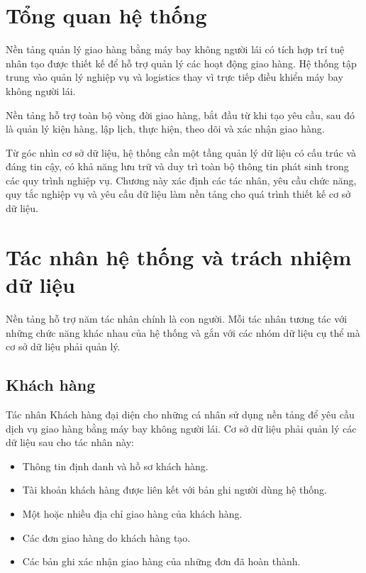 \section{Tổng quan hệ thống}\label{s:overview}

\qquad Nền tảng quản lý giao hàng bằng máy bay không người lái có tích hợp trí tuệ nhân tạo được thiết kế để hỗ trợ quản lý các hoạt động giao hàng. Hệ thống tập trung vào quản lý nghiệp vụ và logistics thay vì trực tiếp điều khiển máy bay không người lái.

Nền tảng hỗ trợ toàn bộ vòng đời giao hàng, bắt đầu từ khi tạo yêu cầu, sau đó là quản lý kiện hàng, lập lịch, thực hiện, theo dõi và xác nhận giao hàng.

Từ góc nhìn cơ sở dữ liệu, hệ thống cần một tầng quản lý dữ liệu có cấu trúc và đáng tin cậy, có khả năng lưu trữ và duy trì toàn bộ thông tin phát sinh trong các quy trình nghiệp vụ. Chương này xác định các tác nhân, yêu cầu chức năng, quy tắc nghiệp vụ và yêu cầu dữ liệu làm nền tảng cho quá trình thiết kế cơ sở dữ liệu.

\section{Tác nhân hệ thống và trách nhiệm dữ liệu}\label{s:actors}

Nền tảng hỗ trợ năm tác nhân chính là con người. Mỗi tác nhân tương tác với những chức năng khác nhau của hệ thống và gắn với các nhóm dữ liệu cụ thể mà cơ sở dữ liệu phải quản lý.

\subsection{Khách hàng}

Tác nhân Khách hàng đại diện cho những cá nhân sử dụng nền tảng để yêu cầu dịch vụ giao hàng bằng máy bay không người lái. Cơ sở dữ liệu phải quản lý các dữ liệu sau cho tác nhân này:
\begin{itemize}
    \item Thông tin định danh và hồ sơ khách hàng.
    \item Tài khoản khách hàng được liên kết với bản ghi người dùng hệ thống.
    \item Một hoặc nhiều địa chỉ giao hàng của khách hàng.
    \item Các đơn giao hàng do khách hàng tạo.
    \item Các bản ghi xác nhận giao hàng của những đơn đã hoàn thành.
\end{itemize}

